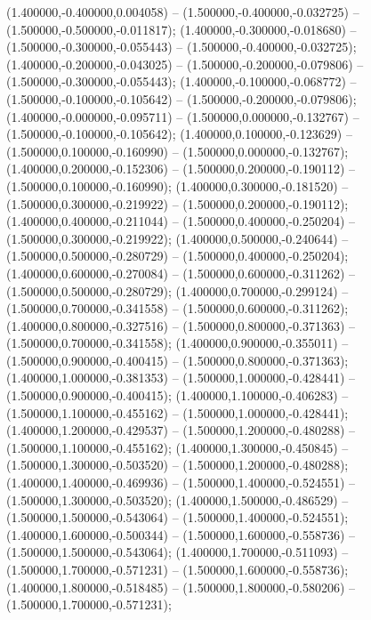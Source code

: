  (1.400000,-0.400000,0.004058) -- (1.500000,-0.400000,-0.032725) -- (1.500000,-0.500000,-0.011817);
 (1.400000,-0.300000,-0.018680) -- (1.500000,-0.300000,-0.055443) -- (1.500000,-0.400000,-0.032725);
 (1.400000,-0.200000,-0.043025) -- (1.500000,-0.200000,-0.079806) -- (1.500000,-0.300000,-0.055443);
 (1.400000,-0.100000,-0.068772) -- (1.500000,-0.100000,-0.105642) -- (1.500000,-0.200000,-0.079806);
 (1.400000,-0.000000,-0.095711) -- (1.500000,0.000000,-0.132767) -- (1.500000,-0.100000,-0.105642);
 (1.400000,0.100000,-0.123629) -- (1.500000,0.100000,-0.160990) -- (1.500000,0.000000,-0.132767);
 (1.400000,0.200000,-0.152306) -- (1.500000,0.200000,-0.190112) -- (1.500000,0.100000,-0.160990);
 (1.400000,0.300000,-0.181520) -- (1.500000,0.300000,-0.219922) -- (1.500000,0.200000,-0.190112);
 (1.400000,0.400000,-0.211044) -- (1.500000,0.400000,-0.250204) -- (1.500000,0.300000,-0.219922);
 (1.400000,0.500000,-0.240644) -- (1.500000,0.500000,-0.280729) -- (1.500000,0.400000,-0.250204);
 (1.400000,0.600000,-0.270084) -- (1.500000,0.600000,-0.311262) -- (1.500000,0.500000,-0.280729);
 (1.400000,0.700000,-0.299124) -- (1.500000,0.700000,-0.341558) -- (1.500000,0.600000,-0.311262);
 (1.400000,0.800000,-0.327516) -- (1.500000,0.800000,-0.371363) -- (1.500000,0.700000,-0.341558);
 (1.400000,0.900000,-0.355011) -- (1.500000,0.900000,-0.400415) -- (1.500000,0.800000,-0.371363);
 (1.400000,1.000000,-0.381353) -- (1.500000,1.000000,-0.428441) -- (1.500000,0.900000,-0.400415);
 (1.400000,1.100000,-0.406283) -- (1.500000,1.100000,-0.455162) -- (1.500000,1.000000,-0.428441);
 (1.400000,1.200000,-0.429537) -- (1.500000,1.200000,-0.480288) -- (1.500000,1.100000,-0.455162);
 (1.400000,1.300000,-0.450845) -- (1.500000,1.300000,-0.503520) -- (1.500000,1.200000,-0.480288);
 (1.400000,1.400000,-0.469936) -- (1.500000,1.400000,-0.524551) -- (1.500000,1.300000,-0.503520);
 (1.400000,1.500000,-0.486529) -- (1.500000,1.500000,-0.543064) -- (1.500000,1.400000,-0.524551);
 (1.400000,1.600000,-0.500344) -- (1.500000,1.600000,-0.558736) -- (1.500000,1.500000,-0.543064);
 (1.400000,1.700000,-0.511093) -- (1.500000,1.700000,-0.571231) -- (1.500000,1.600000,-0.558736);
 (1.400000,1.800000,-0.518485) -- (1.500000,1.800000,-0.580206) -- (1.500000,1.700000,-0.571231);
